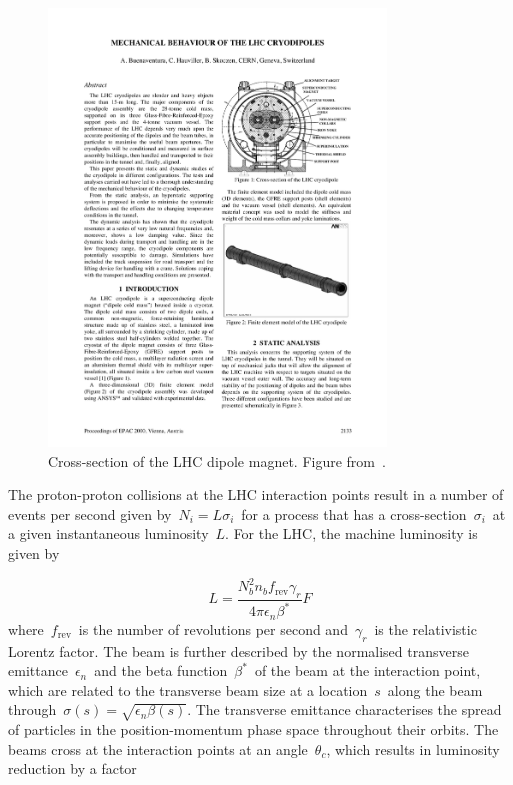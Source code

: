 \begin{figure}
\begin{centering}
\includegraphics[width=0.8\textwidth]{figures/exp/cryodipole.pdf}
\caption[Cross-section of the LHC dipole magnet]{Cross-section of the LHC dipole magnet. Figure from~\cite{Evans:2008zzb}.}
\label{fig:lhc_magnet}
\end{centering}
\end{figure}

The proton-proton collisions at the LHC interaction points result in a number of events per second given by~$N_i = L \sigma_i$~for a process that has a cross-section~$\sigma_i$~at a given instantaneous luminosity~$L$. For the LHC, the machine luminosity is given by

\begin{equation}
L = \frac{N_b^2 n_b f_\mathrm{rev} \gamma_r}{4 \pi \epsilon_n \beta^*} F
\end{equation}
where~$f_{\mathrm{rev}}$~is the number of revolutions per second and~$\gamma_r$~is the relativistic Lorentz factor. The beam is further described by the normalised transverse emittance~$\epsilon_n$~and the beta function~$\beta^*$~of the beam at the interaction point, which are related to the transverse beam size at a location~$s$~along the beam through~$\sigma(s) = \sqrt{\epsilon_n \beta(s)}$. The transverse emittance characterises the spread of particles in the position-momentum phase space throughout their orbits. The beams cross at the interaction points at an angle~$\theta_c$, which results in luminosity reduction by a factor

